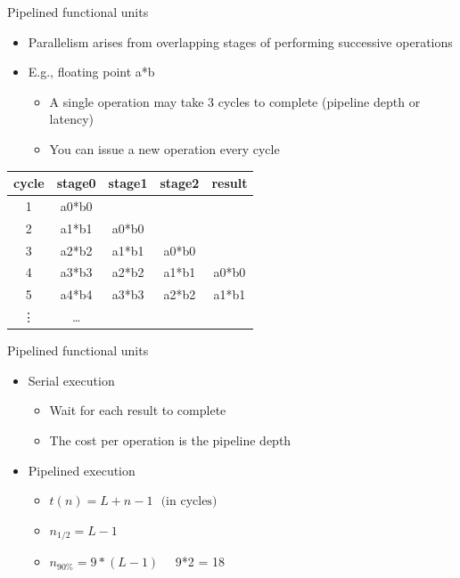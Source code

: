 \begin{frame}{Pipelined functional units}
  \begin{itemize}
  \item Parallelism arises from overlapping stages of performing successive operations
  \item E.g., floating point a*b
    \begin{itemize}
    \item A single operation may take 3 cycles to complete (pipeline depth or latency)
    \item You can issue a new operation every cycle
    \end{itemize}
  \end{itemize}

  \begin{center}
    \begin{tabular}{ccccc}
 cycle & stage0 & stage1 & stage2 & result \\ \hline
  1    & a0*b0  &        &        & \\
  2    & a1*b1  &a0*b0   &        & \\
  3    & a2*b2  &a1*b1   & a0*b0  & \\
  4    & a3*b3  &a2*b2   & a1*b1  & a0*b0 \\
  5    & a4*b4  &a3*b3   & a2*b2  & a1*b1 \\
  \vdots    & \ldots &        &        &       \\ \hline

    \end{tabular}
  \end{center}
  
\end{frame}

\begin{frame}{Pipelined functional units}
  \begin{itemize}
  \item Serial execution 
    \begin{itemize}
    \item Wait for each result to complete
    \item The cost per operation is the pipeline depth
    \end{itemize}
  \item Pipelined execution
    \begin{itemize}
    \item $t(n) = L + n - 1 \ \ \ \mbox{(in cycles)}$
    \item $n_{1/2} = L-1$
    \item $n_{90\%} = 9*(L-1)$  \ \  9*2 = 18
    \end{itemize}
  \end{itemize}
\end{frame}

